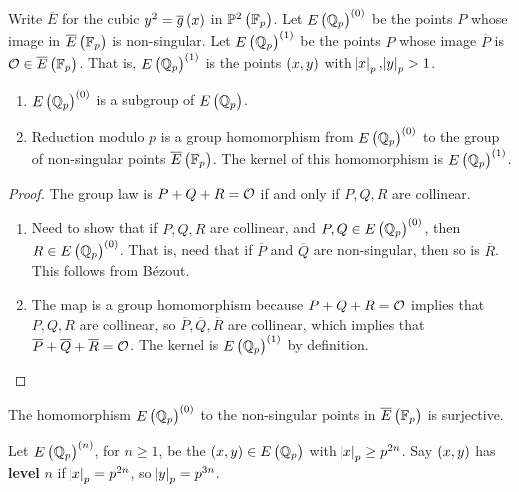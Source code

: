 \begin{definition}
Write $ \overline{E} $ for the cubic $ y^2 = \overline{g}\br{x} $ in $ \PP^2\br{\FF_p} $. Let $ E\br{\QQ_p}^{\br{0}} $ be the points $ P $ whose image in $ \overline{E}\br{\FF_p} $ is non-singular. Let $ E\br{\QQ_p}^{\br{1}} $ be the points $ P $ whose image $ \overline{P} $ is $ \OOO \in \overline{E}\br{\FF_p} $. That is, $ E\br{\QQ_p}^{\br{1}} $ is the points $ \br{x, y} $ with $ \abs{x}_p, \abs{y}_p > 1 $.
\end{definition}

\begin{lemma}
\label{lem:8.5}
\hfill
\begin{enumerate}
\item $ E\br{\QQ_p}^{\br{0}} $ is a subgroup of $ E\br{\QQ_p} $.
\item Reduction modulo $ p $ is a group homomorphism from $ E\br{\QQ_p}^{\br{0}} $ to the group of non-singular points $ \overline{E}\br{\FF_p} $. The kernel of this homomorphism is $ E\br{\QQ_p}^{\br{1}} $.
\end{enumerate}
\end{lemma}

\begin{proof}
The group law is $ P + Q + R = \mathcal{O} $ if and only if $ P, Q, R $ are collinear.
\begin{enumerate}
\item Need to show that if $ P, Q, R $ are collinear, and $ P, Q \in E\br{\QQ_p}^{\br{0}} $, then $ R \in E\br{\QQ_p}^{\br{0}} $. That is, need that if $ \overline{P} $ and $ \overline{Q} $ are non-singular, then so is $ \overline{R} $. This follows from B\'ezout.
\item The map is a group homomorphism because $ P + Q + R = \mathcal{O} $ implies that $ P, Q, R $ are collinear, so $ \overline{P}, \overline{Q}, \overline{R} $ are collinear, which implies that $ \overline{P} + \overline{Q} + \overline{R} = \mathcal{O} $. The kernel is $ E\br{\QQ_p}^{\br{1}} $ by definition.
\end{enumerate}
\end{proof}

\begin{remark}
The homomorphism $ E\br{\QQ_p}^{\br{0}} $ to the non-singular points in $ \overline{E}\br{\FF_p} $ is surjective.
\end{remark}

\pagebreak

Let $ E\br{\QQ_p}^{\br{n}} $, for $ n \ge 1 $, be the $ \br{x, y} \in E\br{\QQ_p} $ with $ \abs{x}_p \ge p^{2n} $. Say $ \br{x, y} $ has \textbf{level} $ n $ if $ \abs{x}_p = p^{2n} $, so $ \abs{y}_p = p^{3n} $.


